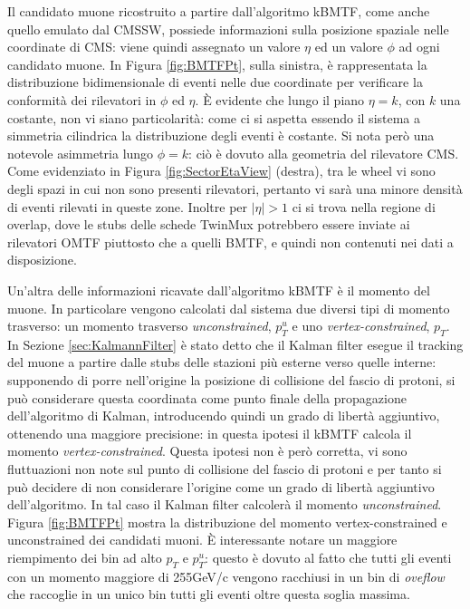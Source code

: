 Il candidato muone ricostruito a partire dall'algoritmo kBMTF, come anche quello emulato dal CMSSW, possiede informazioni sulla posizione spaziale nelle coordinate di CMS: viene quindi assegnato un valore $\eta$ ed un valore $\phi$ ad ogni candidato muone. In Figura \ref{fig:BMTFPt}, sulla sinistra, è rappresentata la distribuzione bidimensionale di eventi nelle due coordinate per verificare la conformità dei rilevatori in $\phi$ ed $\eta$. È evidente che lungo il piano $\eta = k$, con $k$ una costante, non vi siano particolarità: come ci si aspetta essendo il sistema a simmetria cilindrica la distribuzione degli eventi è costante. Si nota però una notevole asimmetria lungo $\phi = k$: ciò è dovuto alla geometria del rilevatore CMS. Come evidenziato in Figura \ref{fig:SectorEtaView} (destra), tra le wheel vi sono degli spazi in cui non sono presenti rilevatori, pertanto vi sarà una minore densità di eventi rilevati in queste zone. Inoltre per $|\eta| > 1$ ci si trova nella regione di overlap, dove le stubs delle schede TwinMux potrebbero essere inviate ai rilevatori OMTF piuttosto che a quelli BMTF, e quindi non contenuti nei dati a disposizione.

Un'altra delle informazioni ricavate dall'algoritmo kBMTF è il momento del muone. In particolare vengono calcolati dal sistema due diversi tipi di momento trasverso: un momento trasverso \textit{unconstrained}, $p_T^u$ e uno \textit{vertex-constrained}, $p_T$. In Sezione \ref{sec:KalmannFilter} è stato detto che il Kalman filter esegue il tracking del muone a partire dalle stubs delle stazioni più esterne verso quelle interne: supponendo di porre nell'origine la posizione di collisione del fascio di protoni, si può considerare questa coordinata come punto finale della propagazione dell'algoritmo di Kalman, introducendo quindi un grado di libertà aggiuntivo, ottenendo una maggiore precisione: in questa ipotesi il kBMTF calcola il momento \textit{vertex-constrained}. \newline
Questa ipotesi non è però corretta, vi sono fluttuazioni non note sul punto di collisione del fascio di protoni e per tanto si può decidere di non considerare l'origine come un grado di libertà aggiuntivo dell'algoritmo. In tal caso il Kalman filter calcolerà il momento \textit{unconstrained}. 
Figura \ref{fig:BMTFPt} mostra la distribuzione del momento vertex-constrained e unconstrained dei candidati muoni. È interessante notare un maggiore riempimento dei bin ad alto $p_T$ e $p_T^u$: questo è dovuto al fatto che tutti gli eventi con un momento maggiore di 255GeV/c vengono racchiusi in un bin di \textit{oveflow} che raccoglie in un unico bin tutti gli eventi oltre questa soglia massima.


